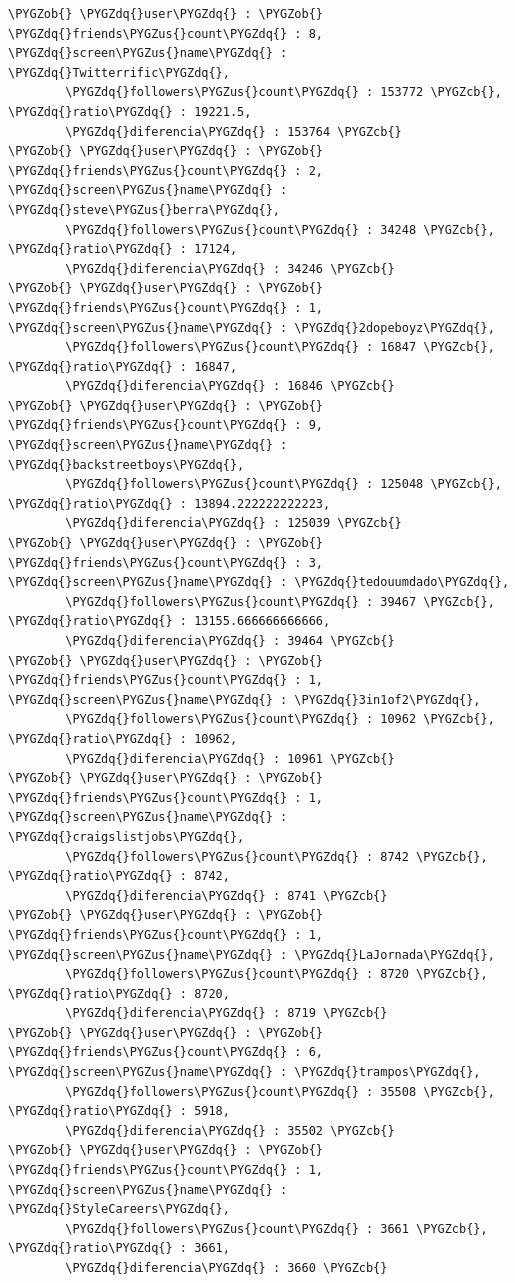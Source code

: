 \documentclass[a4paper,10pt,english]{sphinxmanual}
\def\PYGZus{\char`\_}
\def\PYGZob{\char`\{}
\def\PYGZcb{\char`\}}
\def\PYGZdq{\char`\"}
\begin{document}
\begin{itemize}
\begin{Verbatim}[commandchars=\\\{\}]
\PYGZob{} \PYGZdq{}user\PYGZdq{} : \PYGZob{} \PYGZdq{}friends\PYGZus{}count\PYGZdq{} : 8, \PYGZdq{}screen\PYGZus{}name\PYGZdq{} : \PYGZdq{}Twitterrific\PYGZdq{},
        \PYGZdq{}followers\PYGZus{}count\PYGZdq{} : 153772 \PYGZcb{}, \PYGZdq{}ratio\PYGZdq{} : 19221.5,
        \PYGZdq{}diferencia\PYGZdq{} : 153764 \PYGZcb{}
\PYGZob{} \PYGZdq{}user\PYGZdq{} : \PYGZob{} \PYGZdq{}friends\PYGZus{}count\PYGZdq{} : 2, \PYGZdq{}screen\PYGZus{}name\PYGZdq{} : \PYGZdq{}steve\PYGZus{}berra\PYGZdq{},
        \PYGZdq{}followers\PYGZus{}count\PYGZdq{} : 34248 \PYGZcb{}, \PYGZdq{}ratio\PYGZdq{} : 17124,
        \PYGZdq{}diferencia\PYGZdq{} : 34246 \PYGZcb{}
\PYGZob{} \PYGZdq{}user\PYGZdq{} : \PYGZob{} \PYGZdq{}friends\PYGZus{}count\PYGZdq{} : 1, \PYGZdq{}screen\PYGZus{}name\PYGZdq{} : \PYGZdq{}2dopeboyz\PYGZdq{},
        \PYGZdq{}followers\PYGZus{}count\PYGZdq{} : 16847 \PYGZcb{}, \PYGZdq{}ratio\PYGZdq{} : 16847,
        \PYGZdq{}diferencia\PYGZdq{} : 16846 \PYGZcb{}
\PYGZob{} \PYGZdq{}user\PYGZdq{} : \PYGZob{} \PYGZdq{}friends\PYGZus{}count\PYGZdq{} : 9, \PYGZdq{}screen\PYGZus{}name\PYGZdq{} : \PYGZdq{}backstreetboys\PYGZdq{},
        \PYGZdq{}followers\PYGZus{}count\PYGZdq{} : 125048 \PYGZcb{}, \PYGZdq{}ratio\PYGZdq{} : 13894.222222222223,
        \PYGZdq{}diferencia\PYGZdq{} : 125039 \PYGZcb{}
\PYGZob{} \PYGZdq{}user\PYGZdq{} : \PYGZob{} \PYGZdq{}friends\PYGZus{}count\PYGZdq{} : 3, \PYGZdq{}screen\PYGZus{}name\PYGZdq{} : \PYGZdq{}tedouumdado\PYGZdq{},
        \PYGZdq{}followers\PYGZus{}count\PYGZdq{} : 39467 \PYGZcb{}, \PYGZdq{}ratio\PYGZdq{} : 13155.666666666666,
        \PYGZdq{}diferencia\PYGZdq{} : 39464 \PYGZcb{}
\PYGZob{} \PYGZdq{}user\PYGZdq{} : \PYGZob{} \PYGZdq{}friends\PYGZus{}count\PYGZdq{} : 1, \PYGZdq{}screen\PYGZus{}name\PYGZdq{} : \PYGZdq{}3in1of2\PYGZdq{},
        \PYGZdq{}followers\PYGZus{}count\PYGZdq{} : 10962 \PYGZcb{}, \PYGZdq{}ratio\PYGZdq{} : 10962,
        \PYGZdq{}diferencia\PYGZdq{} : 10961 \PYGZcb{}
\PYGZob{} \PYGZdq{}user\PYGZdq{} : \PYGZob{} \PYGZdq{}friends\PYGZus{}count\PYGZdq{} : 1, \PYGZdq{}screen\PYGZus{}name\PYGZdq{} : \PYGZdq{}craigslistjobs\PYGZdq{},
        \PYGZdq{}followers\PYGZus{}count\PYGZdq{} : 8742 \PYGZcb{}, \PYGZdq{}ratio\PYGZdq{} : 8742,
        \PYGZdq{}diferencia\PYGZdq{} : 8741 \PYGZcb{}
\PYGZob{} \PYGZdq{}user\PYGZdq{} : \PYGZob{} \PYGZdq{}friends\PYGZus{}count\PYGZdq{} : 1, \PYGZdq{}screen\PYGZus{}name\PYGZdq{} : \PYGZdq{}LaJornada\PYGZdq{},
        \PYGZdq{}followers\PYGZus{}count\PYGZdq{} : 8720 \PYGZcb{}, \PYGZdq{}ratio\PYGZdq{} : 8720,
        \PYGZdq{}diferencia\PYGZdq{} : 8719 \PYGZcb{}
\PYGZob{} \PYGZdq{}user\PYGZdq{} : \PYGZob{} \PYGZdq{}friends\PYGZus{}count\PYGZdq{} : 6, \PYGZdq{}screen\PYGZus{}name\PYGZdq{} : \PYGZdq{}trampos\PYGZdq{},
        \PYGZdq{}followers\PYGZus{}count\PYGZdq{} : 35508 \PYGZcb{}, \PYGZdq{}ratio\PYGZdq{} : 5918,
        \PYGZdq{}diferencia\PYGZdq{} : 35502 \PYGZcb{}
\PYGZob{} \PYGZdq{}user\PYGZdq{} : \PYGZob{} \PYGZdq{}friends\PYGZus{}count\PYGZdq{} : 1, \PYGZdq{}screen\PYGZus{}name\PYGZdq{} : \PYGZdq{}StyleCareers\PYGZdq{},
        \PYGZdq{}followers\PYGZus{}count\PYGZdq{} : 3661 \PYGZcb{}, \PYGZdq{}ratio\PYGZdq{} : 3661,
        \PYGZdq{}diferencia\PYGZdq{} : 3660 \PYGZcb{}
\end{Verbatim}


\end{itemize}
\end{document}
